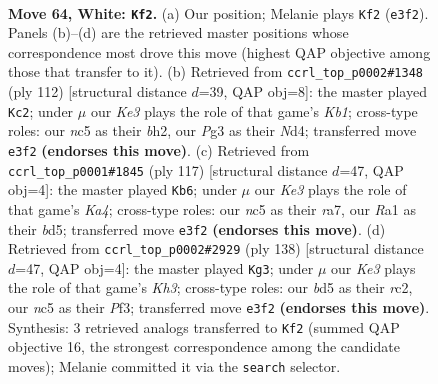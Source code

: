 \documentclass[11pt]{article}
\begin{document}
\clearpage

\begin{figure}[p]\centering
\begin{subfigure}{0.46\textwidth}\centering
\resizebox{\linewidth}{!}{%
\newchessgame
\chessboard[
  setfen={8/P7/5k2/2nb2N1/1p3P2/1P2K1PB/7P/R7 w - - 0 64},
  showmover=false,
  pgfstyle=straightmove, color=movearrow, markmove={e3-f2}
]}
\caption{}
\end{subfigure}\hfill
\begin{subfigure}{0.46\textwidth}\centering
\resizebox{\linewidth}{!}{%
\newchessgame
\chessboard[
  setfen={4b3/6pk/1n6/3B1P2/3NP3/2P5/1P5b/1K6 w - - 2 57},
  showmover=false,
  pgfstyle=straightmove, color=movearrow, markmove={b1-c2}
]}
\caption{}
\end{subfigure}
\\[4pt]
\begin{subfigure}{0.46\textwidth}\centering
\resizebox{\linewidth}{!}{%
\newchessgame
\chessboard[
  setfen={8/R7/8/kp1Bp1p1/4P1bp/7r/2N3K1/8 b - - 1 59},
  showmover=false,
  pgfstyle=straightmove, color=movearrow, markmove={a5-b6}
]}
\caption{}
\end{subfigure}\hfill
\begin{subfigure}{0.46\textwidth}\centering
\resizebox{\linewidth}{!}{%
\newchessgame
\chessboard[
  setfen={8/1bB4p/1P4k1/8/4N2P/5P1K/2r3P1/8 w - - 45 70},
  showmover=false,
  pgfstyle=straightmove, color=movearrow, markmove={h3-g3}
]}
\caption{}
\end{subfigure}
\caption{\textbf{Move 64, White: \texttt{Kf2}.} (a) Our position; Melanie plays \texttt{Kf2} (\texttt{e3f2}). Panels (b)--(d) are the retrieved master positions whose correspondence most drove this move (highest QAP objective among those that transfer to it). (b) Retrieved from \texttt{ccrl\_top\_p0002\#1348} (ply 112) [structural distance $d$=39, QAP obj=8]: the master played \texttt{Kc2}; under $\mu$ our \emph{Ke3} plays the role of that game's \emph{Kb1}; cross-type roles: our \emph{n}c5 as their \emph{b}h2, our \emph{P}g3 as their \emph{N}d4; transferred move \texttt{e3f2} \textbf{(endorses this move)}. (c) Retrieved from \texttt{ccrl\_top\_p0001\#1845} (ply 117) [structural distance $d$=47, QAP obj=4]: the master played \texttt{Kb6}; under $\mu$ our \emph{Ke3} plays the role of that game's \emph{Ka4}; cross-type roles: our \emph{n}c5 as their \emph{r}a7, our \emph{R}a1 as their \emph{b}d5; transferred move \texttt{e3f2} \textbf{(endorses this move)}. (d) Retrieved from \texttt{ccrl\_top\_p0002\#2929} (ply 138) [structural distance $d$=47, QAP obj=4]: the master played \texttt{Kg3}; under $\mu$ our \emph{Ke3} plays the role of that game's \emph{Kh3}; cross-type roles: our \emph{b}d5 as their \emph{r}c2, our \emph{n}c5 as their \emph{P}f3; transferred move \texttt{e3f2} \textbf{(endorses this move)}. Synthesis: 3 retrieved analogs transferred to \texttt{Kf2} (summed QAP objective 16, the strongest correspondence among the candidate moves); Melanie committed it via the \texttt{search} selector.}
\label{fig:thought-m126}
\end{figure}
\end{document}
